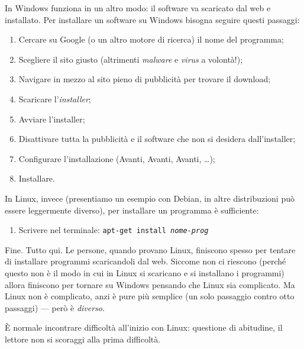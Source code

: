 In Windows funziona in un altro modo: il software va scaricato dal web e installato. Per installare un software su Windows bisogna seguire questi passaggi:
\begin{enumerate}
	\item Cercare su Google (o un altro motore di ricerca) il nome del programma;
	\item Scegliere il sito giusto (altrimenti \textit{malware} e \textit{virus} a volontà!);
	\item Navigare in mezzo al sito pieno di pubblicità per trovare il download;
	\item Scaricare l'\textit{installer};
	\item Avviare l'installer;
	\item Disattivare tutta la pubblicità e il software che non si desidera dall'installer;
	\item Configurare l'installazione (Avanti, Avanti, Avanti, \ldots);
	\item Installare.
\end{enumerate}
In Linux, invece (presentiamo un esempio con Debian, in altre distribuzioni può essere leggermente diverso), per installare un programma è sufficiente:
\begin{enumerate}
	\item Scrivere nel terminale: \texttt{apt-get install \textit{nome-prog}}
\end{enumerate}
Fine. Tutto qui. Le persone, quando provano Linux, finiscono spesso per tentare di installare programmi scaricandoli dal web. Siccome non ci riescono (perché questo non è il modo in cui in Linux si scaricano e si installano i programmi) allora finiscono per tornare su Windows pensando che Linux sia complicato. Ma Linux non è complicato, anzi è pure più semplice (un solo passaggio contro otto passaggi) --- però è \textit{diverso}.

È normale incontrare difficoltà all'inizio con Linux: questione di abitudine, il lettore non si scoraggi alla prima difficoltà.
